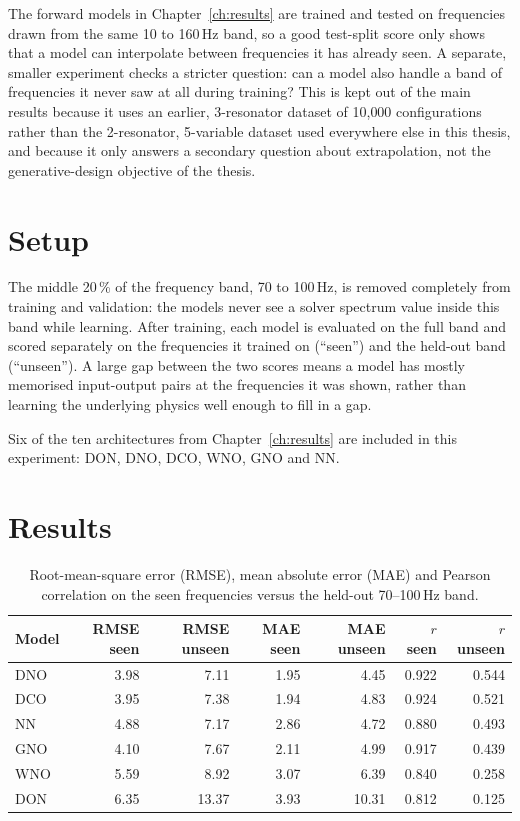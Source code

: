 The forward models in Chapter~\ref{ch:results} are trained and tested on frequencies drawn from the same 10 to 160\,Hz band, so a good test-split score only shows that a model can interpolate between frequencies it has already seen. A separate, smaller experiment checks a stricter question: can a model also handle a band of frequencies it never saw at all during training? This is kept out of the main results because it uses an earlier, 3-resonator dataset of 10{,}000 configurations rather than the 2-resonator, 5-variable dataset used everywhere else in this thesis, and because it only answers a secondary question about extrapolation, not the generative-design objective of the thesis.

\section{Setup}

The middle 20\,\% of the frequency band, 70 to 100\,Hz, is removed completely from training and validation: the models never see a solver spectrum value inside this band while learning. After training, each model is evaluated on the full band and scored separately on the frequencies it trained on (``seen'') and the held-out band (``unseen''). A large gap between the two scores means a model has mostly memorised input-output pairs at the frequencies it was shown, rather than learning the underlying physics well enough to fill in a gap.

Six of the ten architectures from Chapter~\ref{ch:results} are included in this experiment: DON, DNO, DCO, WNO, GNO and NN.

\section{Results}

\begin{table}[h]
\centering
\caption[Seen vs. unseen RMSE in the frequency-holdout experiment]{Root-mean-square error (RMSE), mean absolute error (MAE) and Pearson correlation on the seen frequencies versus the held-out 70--100\,Hz band.}
\begin{tabular}{lrrrrrr}
\hline
Model & RMSE seen & RMSE unseen & MAE seen & MAE unseen & $r$ seen & $r$ unseen \\
\hline
DNO & 3.98 & 7.11 & 1.95 & 4.45 & 0.922 & 0.544 \\
DCO & 3.95 & 7.38 & 1.94 & 4.83 & 0.924 & 0.521 \\
NN  & 4.88 & 7.17 & 2.86 & 4.72 & 0.880 & 0.493 \\
GNO & 4.10 & 7.67 & 2.11 & 4.99 & 0.917 & 0.439 \\
WNO & 5.59 & 8.92 & 3.07 & 6.39 & 0.840 & 0.258 \\
DON & 6.35 & 13.37 & 3.93 & 10.31 & 0.812 & 0.125 \\
\hline
\end{tabular}
\end{table}

